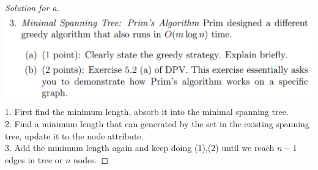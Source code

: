 \documentclass[12pt]{article}
\begin{document}
\begin{proof}[Solution for a]
	\includegraphics[scale=0.35]{3.png}\\
	1. First find the minimum length, absorb it into the minimal spanning tree.\\
	2. Find a minimum length that can generated by the set in the existing spanning tree, update it to the node attribute.\\
	3. Add the minimum length again and keep doing (1),(2) until we reach $n-1$ edges in tree or $n$ nodes.
\end{proof}
\end{document}
